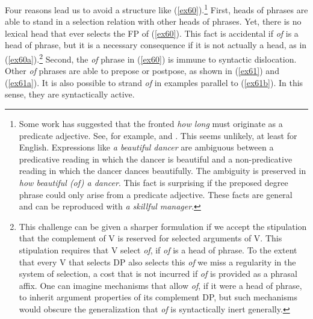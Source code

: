 \documentclass[output=paper,
modfonts
]{LSP/langsci}
\begin{document}
{{{Four reasons lead us to avoid a structure like ({\ref{ex60}}).{\footnote{Some work has suggested that the fronted {\textit{how long}} must originate as a predicate adjective.  See, for example, {\citet{Wood11}} and \citet{Troseth09}.  This seems unlikely, at least for English.  Expressions like {\textit{a beautiful dancer}} are ambiguous between a predicative reading in which the dancer is beautiful and a non-predicative reading in which the dancer dances beautifully.  The ambiguity is preserved in {\textit{how beautiful (of) a dancer}}.  This fact is surprising if the preposed degree phrase could only arise from a predicate adjective.  These facts are general and can be reproduced with {\textit{a skillful manager}}.}}  First, heads of phrases are able to stand in a selection relation with other heads of phrases.  Yet, there is no lexical head that ever selects the FP of ({\ref{ex60}}).  This fact is accidental if {\textit{of}} is a head of phrase, but it is a necessary consequence if it is not actually a head, as in ({\ref{ex60a}}).{\footnote{This challenge can be given a sharper formulation if we accept the stipulation that the complement of V is reserved for selected arguments of V.  This stipulation requires that V select {\textit{of}}, if {\textit{of}} is a head of phrase.  To the extent that every V that selects DP also selects this {\textit{of}} we miss a regularity in the system of selection, a cost that is not incurred if {\textit{of}} is provided as a phrasal affix.  One can imagine mechanisms that allow {\textit{of}}, if it were a head of phrase, to inherit argument properties of its complement DP, but such mechanisms would obscure the generalization that {\textit{of}} is syntactically inert generally.}} Second,  the {\textit{of}} phrase in ({\ref{ex60}}) is immune to syntactic dislocation.  Other {\textit{of}} phrases are able to prepose or postpose, as shown in ({\ref{ex61}}) and ({\ref{ex61a}}).  It is also possible to strand {\textit{of}} in examples parallel to ({\ref{ex61b}}).  In this sense, they are syntactically active.

\begin{exe}
\ex\label{ex61}
\begin{xlist}
\end{xlist}

\ex\label{ex61a}
\begin{xlist}
\end{xlist}


\end{exe}}}}
\end{document}
